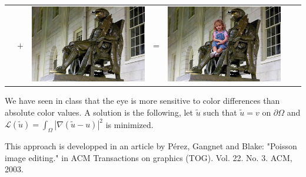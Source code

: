 \documentclass[a4paper]{article}
\begin{document}
\begin{tabular}{m{1.6cm}m{.6cm}m{1.6cm}m{.6cm}m{4.7cm}m{.6cm}m{4.7cm}}
    & {\Huge$+$} &
    \includegraphics[scale=.2]{results_poisson/background.png}
    & {\Huge=} &
    \includegraphics[scale=.2]{results_poisson/naive.png}
  \end{tabular}
  
  \medskip We have seen in class that the eye is more sensitive to color differences than absolute color values. A solution is the following, let $\tilde u$ such that $\tilde u = v$ on $\partial\Omega$ and $\mathcal L(\tilde u) = \int_\Omega |\nabla(\tilde u - u)|^2$ is minimized.
  
  \medskip This approach is developped in an article by Pérez, Gangnet and Blake: "Poisson image editing." in ACM Transactions on graphics (TOG). Vol. 22. No. 3. ACM, 2003.
  

  
\end{document}
